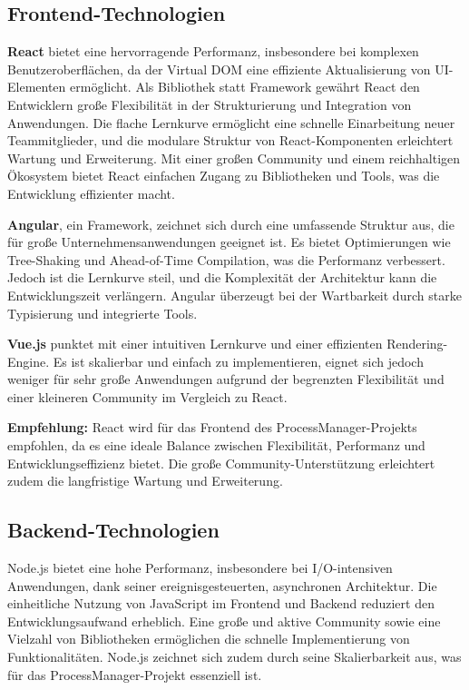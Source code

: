 \subsection{Frontend-Technologien}
\textbf{React} bietet eine hervorragende Performanz, insbesondere bei komplexen Benutzeroberflächen, da der Virtual DOM eine effiziente Aktualisierung von UI-Elementen ermöglicht. Als Bibliothek statt Framework gewährt React den Entwicklern große Flexibilität in der Strukturierung und Integration von Anwendungen. Die flache Lernkurve ermöglicht eine schnelle Einarbeitung neuer Teammitglieder, und die modulare Struktur von React-Komponenten erleichtert Wartung und Erweiterung. Mit einer großen Community und einem reichhaltigen Ökosystem bietet React einfachen Zugang zu Bibliotheken und Tools, was die Entwicklung effizienter macht. \cite[Vgl.][S. 35-48]{Springer} \cite[Vgl.][]{React} \cite[Vgl.][Kapitel 1]{Thomas} 

\textbf{Angular}, ein Framework, zeichnet sich durch eine umfassende Struktur aus, die für große Unternehmensanwendungen geeignet ist. Es bietet Optimierungen wie Tree-Shaking und Ahead-of-Time Compilation, was die Performanz verbessert. Jedoch ist die Lernkurve steil, und die Komplexität der Architektur kann die Entwicklungszeit verlängern. Angular überzeugt bei der Wartbarkeit durch starke Typisierung und integrierte Tools. \cite[Vgl.][]{Murray} \cite[Vgl.][Kapitel 1]{Wilken} \cite[Vgl.][]{Angular} \cite[Vgl.][]{Holmes}

\textbf{Vue.js} punktet mit einer intuitiven Lernkurve und einer effizienten Rendering-Engine. Es ist skalierbar und einfach zu implementieren, eignet sich jedoch weniger für sehr große Anwendungen aufgrund der begrenzten Flexibilität und einer kleineren Community im Vergleich zu React. \cite[Vgl.][]{Vue}

\textbf{Empfehlung:} React wird für das Frontend des ProcessManager-Projekts empfohlen, da es eine ideale Balance zwischen Flexibilität, Performanz und Entwicklungseffizienz bietet. Die große Community-Unterstützung erleichtert zudem die langfristige Wartung und Erweiterung.

\subsection{Backend-Technologien}
Node.js bietet eine hohe Performanz, insbesondere bei I/O-intensiven Anwendungen, dank seiner ereignisgesteuerten, asynchronen Architektur. Die einheitliche Nutzung von JavaScript im Frontend und Backend reduziert den Entwicklungsaufwand erheblich. Eine große und aktive Community sowie eine Vielzahl von Bibliotheken ermöglichen die schnelle Implementierung von Funktionalitäten. Node.js zeichnet sich zudem durch seine Skalierbarkeit aus, was für das ProcessManager-Projekt essenziell ist. \cite[Vgl.][]{Holmes} \cite[Vgl.][]{Node} \cite[Vgl.][]{Syed}


